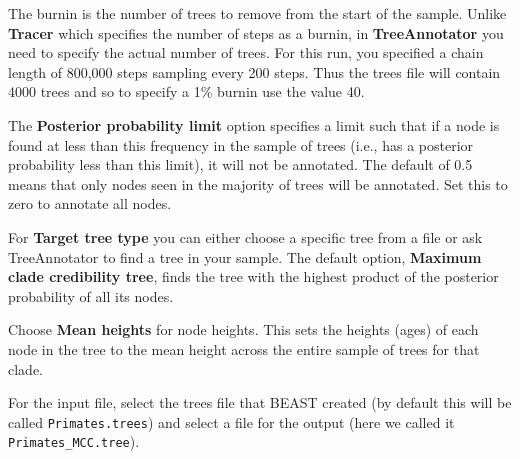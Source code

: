 \documentclass[12pt]{article}
\begin{document}
\medskip{}


\medskip{}

The burnin is the number of trees to remove from the start of the sample. Unlike {\bf Tracer} which specifies the number of
steps as a burnin, in {\bf TreeAnnotator} you need to specify the actual number of trees. For this run, you specified a chain
length of 800,000 steps sampling every 200 steps. Thus the trees file will contain 4000 trees and so to specify a 1\% burnin
use the value 40.

The {\bf Posterior probability limit} option specifies a limit such that if a node is found at less than this frequency in the sample
of trees (i.e., has a posterior probability less than this limit), it will not be annotated. The default of 0.5 means that only nodes
seen in the majority of trees will be annotated. Set this to zero to annotate all nodes.

For {\bf Target tree type} you can either choose a specific tree from a file or ask TreeAnnotator to find a tree in your sample.
The default option, {\bf Maximum clade credibility tree}, finds the tree with the highest product of the posterior probability of
all its nodes.

Choose {\bf Mean heights} for node heights. This sets the heights (ages) of each node in the tree to the mean height across the
entire sample of trees for that clade.

For the input file, select the trees file that BEAST created (by default this will be called \texttt{Primates.trees}) and select a file for the
output (here we called it \texttt{Primates\_MCC.tree}).
\end{document}
